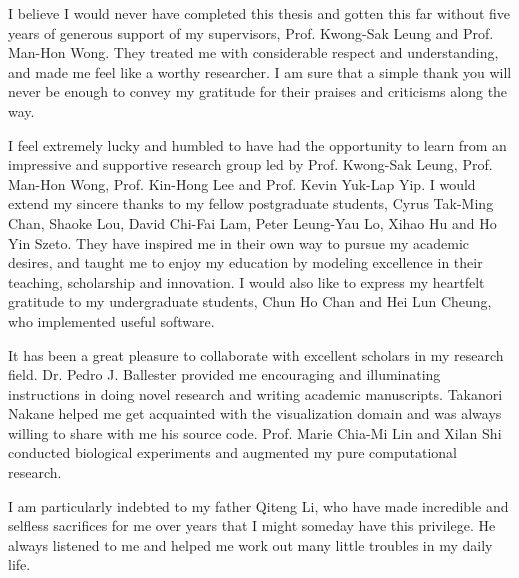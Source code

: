I believe I would never have completed this thesis and gotten this far without five years of generous support of my supervisors, Prof. Kwong-Sak Leung and Prof. Man-Hon Wong. They treated me with considerable respect and understanding, and made me feel like a worthy researcher. I am sure that a simple thank you will never be enough to convey my gratitude for their praises and criticisms along the way.

I feel extremely lucky and humbled to have had the opportunity to learn from an impressive and supportive research group led by Prof. Kwong-Sak Leung, Prof. Man-Hon Wong, Prof. Kin-Hong Lee and Prof. Kevin Yuk-Lap Yip. I would extend my sincere thanks to my fellow postgraduate students, Cyrus Tak-Ming Chan, Shaoke Lou, David Chi-Fai Lam, Peter Leung-Yau Lo, Xihao Hu and Ho Yin Szeto. They have inspired me in their own way to pursue my academic desires, and taught me to enjoy my education by modeling excellence in their teaching, scholarship and innovation. I would also like to express my heartfelt gratitude to my undergraduate students, Chun Ho Chan and Hei Lun Cheung, who implemented useful software.

It has been a great pleasure to collaborate with excellent scholars in my research field. Dr. Pedro J. Ballester provided me encouraging and illuminating instructions in doing novel research and writing academic manuscripts. Takanori Nakane helped me get acquainted with the visualization domain and was always willing to share with me his source code. Prof. Marie Chia-Mi Lin and Xilan Shi conducted biological experiments and augmented my pure computational research.

I am particularly indebted to my father Qiteng Li, who have made incredible and selfless sacrifices for me over years that I might someday have this privilege. He always listened to me and helped me work out many little troubles in my daily life.
